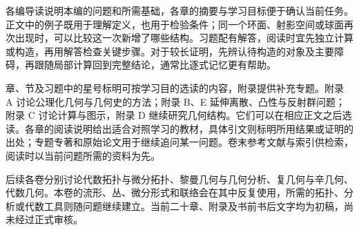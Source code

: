 \ProseParagraphBreak

各编导读说明本编的问题和所需基础，各章的摘要与学习目标便于确认当前任务。正文中的例子既用于理解定义，也用于检验条件；同一个环面、射影空间或球面再次出现时，可以比较这一次新增了哪些结构。习题配有解答，阅读时宜先独立计算或构造，再用解答检查关键步骤。对于较长证明，先辨认待构造的对象及主要障碍，再跟随局部计算回到完整结论，通常比逐式记忆更有帮助。

\ProseParagraphBreak

章、节及习题中的星号标明可按学习目的选读的内容，附录提供补充专题。附录 A 讨论公理化几何与几何史的方法；附录 B、E 延伸离散、凸性与反射群问题；附录 C 讨论计算与图示，附录 D 继续研究几何结构。它们可以在相应正文之后选读。各章的阅读说明给出适合对照学习的教材，具体引文则标明所用结果或证明的出处；专题专著和原始论文用于继续追问某一问题。卷末参考文献与索引供检索，阅读时以当前问题所需的资料为先。

\ProseParagraphBreak

后续各卷分别讨论代数拓扑与微分拓扑、黎曼几何与几何分析、复几何与辛几何、代数几何。本卷的流形、丛、微分形式和联络会在其中反复使用，所需的拓扑、分析或代数工具则随问题继续建立。当前二十章、附录及书前书后文字均为初稿，尚未经过正式审核。
